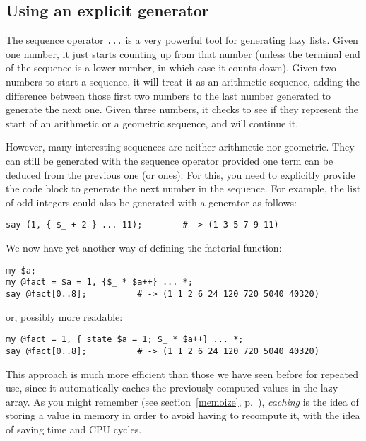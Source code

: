 \subsection{Using an explicit generator}

The sequence operator \verb'...' is a very powerful tool 
for generating lazy lists. Given one number, it just 
starts counting up from that number (unless the 
terminal end of the sequence is a lower number, 
in which case it counts down). Given two numbers 
to start a sequence, it will treat it as an arithmetic 
sequence, adding the difference between those first 
two numbers to the last number generated to generate 
the next one. Given three numbers, it checks to see 
if they represent the start of an arithmetic or a 
geometric sequence, and will continue it.

However, many interesting sequences are neither arithmetic 
nor geometric.  They can still be generated with the 
sequence operator provided one term can be deduced from 
the previous one (or ones). For this, you need to explicitly 
provide the code block to generate the next number in 
the sequence. For example, the list of odd integers 
could also be generated with a generator as follows:

\begin{verbatim}
say (1, { $_ + 2 } ... 11);        # -> (1 3 5 7 9 11)
\end{verbatim}

We now have yet another way of defining the factorial 
function:

\begin{verbatim}
my $a;
my @fact = $a = 1, {$_ * $a++} ... *;
say @fact[0..8];          # -> (1 1 2 6 24 120 720 5040 40320)
\end{verbatim}

or, possibly more readable:

\begin{verbatim}
my @fact = 1, { state $a = 1; $_ * $a++} ... *;
say @fact[0..8];          # -> (1 1 2 6 24 120 720 5040 40320)
\end{verbatim}


This approach is much more efficient than those we have 
seen before for repeated use, since it automatically 
caches the previously computed values in the lazy array. 
As you might remember (see section~\ref{memoize}, 
p.~\pageref{memoize}), \emph{caching} is the idea of 
storing a value in memory in order to avoid having to 
recompute it, with the idea of saving time and CPU cycles.

